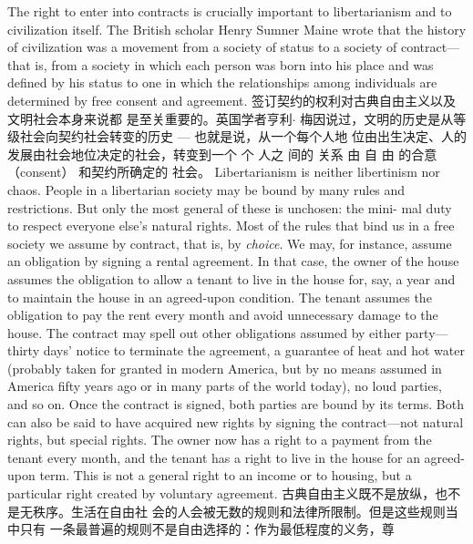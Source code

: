 \begin{paracol}{2}
The right to enter into contracts is crucially important to libertarianism and to civilization itself. The British scholar Henry
Sumner Maine wrote that the history of civilization was a
movement from a society of status to a society of contract---
that is, from a society in which each person was born into his
place and was defined by his status to one in which the relationships among individuals are determined by free consent
and agreement.
\switchcolumn
签订契约的权利对古典自由主义以及文明社会本身来说都
是至关重要的。英国学者亨利$\cdot$ 梅因说过，文明的历史是从等
级社会向契约社会转变的历史 --- 也就是说，从一个每个人地
位由出生决定、人的发展由社会地位决定的社会，转变到一个
个 人之 间的 关系 由 自 由 的合意（consent） 和契约所确定的
社会。
\switchcolumn*
Libertarianism is neither libertinism nor chaos. People in a
libertarian society may be bound by many rules and restrictions. But only the most general of these is unchosen: the mini-
mal duty to respect everyone else's natural rights. Most of the
rules that bind us in a free society we assume by contract, that
is, by \textit{choice}. We may, for instance, assume an obligation by signing a rental agreement. In that case, the owner of the house assumes the obligation to allow a tenant to live in the house for,
say, a year and to maintain the house in an agreed-upon condition. The tenant assumes the obligation to pay the rent every
month and avoid unnecessary damage to the house. The contract may spell out other obligations assumed by either party---
thirty days' notice to terminate the agreement, a guarantee of
heat and hot water (probably taken for granted in modern
America, but by no means assumed in America fifty years ago
or in many parts of the world today), no loud parties, and so on.
Once the contract is signed, both parties are bound by its
terms. Both can also be said to have acquired new rights by
signing the contract---not natural rights, but special rights.
The owner now has a right to a payment from the tenant every
month, and the tenant has a right to live in the house for an
agreed-upon term. This is not a general right to an income or to
housing, but a particular right created by voluntary agreement.
\switchcolumn
古典自由主义既不是放纵，也不是无秩序。生活在自由社
会的人会被无数的规则和法律所限制。但是这些规则当中只有
一条最普遍的规则不是自由选择的：作为最低程度的义务，尊

\end{paracol}
